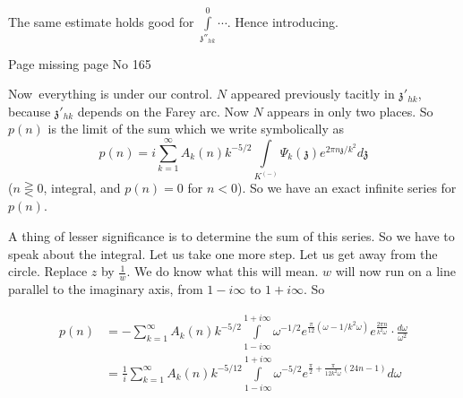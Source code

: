 The same estimate holds good for
$\int\limits^0_{\mathfrak{z}''_{hk}}\cdots$. Hence introducing. 

\begin{center}
  \LARGE{Page missing page No 165}\pageoriginale\
\end{center}

Now\pageoriginale\ everything is under our control. $N$ appeared
previously tacitly in $\mathfrak{z}'_{hk}$, because
$\mathfrak{z}'_{hk}$ depends on the Farey arc. Now $N$ appears in only
two places. So $p(n)$ is the limit of the sum which we write
symbolically as 
$$
p(n) = i \sum^\infty_{k=1} A_k (n) k^{-5/2} \int\limits_{K^{(-)}}
\Psi_k (\mathfrak{z}) e^{2 \pi n \mathfrak{z}/k^2} d\mathfrak{z}
$$
($n \gtreqless 0$, integral, and $p(n)=0$ for $n <0$). So we have an
exact infinite series for $p(n)$.

\medskip
\noindent 
\begin{minipage}[c]{4.5cm}
A thing of lesser significance is to determine the sum of this
series. So we have to speak about the integral. Let us take one more
step. Let us get away from the circle. Replace $z$ by
$\frac{1}{w}$. We do know what this will mean. $w$ will now run on a
line parallel to the imaginary axis, from $1- i \infty$ to $1+ i
\infty$. So
\end{minipage}
\begin{minipage}[c]{5.5cm}
  \begin{figure}[H]
  \end{figure}
\end{minipage}

\begin{align*}
  p(n) & = - \sum^\infty_{k=1} A_k (n) k^{-5/2} \int\limits^{1+ i
    \infty}_{1-i \infty} \omega^{- 1/2} e^{\frac{\pi}{12} (\omega -
    1/k^2 \omega)} e^{\frac{2 \pi n}{k^2 \omega}} \cdot \frac{d
    \omega}{\omega^2}\\
  & = \frac{1}{i} \sum^\infty_{k=1} A_k (n) k^{-5/12} \int\limits^{1+
    i \infty}_{1- i \infty} \omega^{- 5/2} e^{\frac{\pi}{2} +
    \frac{\pi}{12 k^2 \omega} (24n-1)} d \omega
\end{align*}

